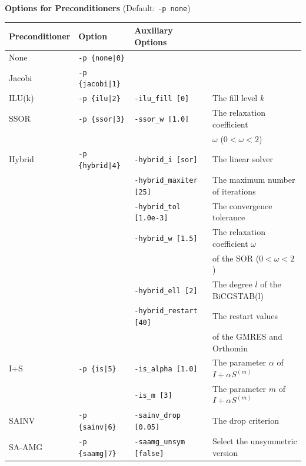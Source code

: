 \documentclass[a4paper]{article}
\begin{document}
\\ \\
\begin{minipage}[t]{\textwidth}
\begin{center}
{\bf Options for Preconditioners} (Default: \verb=-p none=)\\
\begin{tabular}{l|lll}\hline\hline
Preconditioner   & Option           & Auxiliary Options \\ \hline
None     & \verb=-p {none|0}=    &   \\
Jacobi   & \verb=-p {jacobi|1}=  &     \\
ILU(k)   & \verb=-p {ilu|2}=     & \verb=-ilu_fill [0]=        & The fill level $k$ \\
SSOR     & \verb=-p {ssor|3}=    & \verb=-ssor_w [1.0]=        & The relaxation coefficient \\
         &                       &                             & $\omega$ ($0<\omega<2$) \\
Hybrid   & \verb=-p {hybrid|4}=  & \verb=-hybrid_i [sor]=      & The linear solver\\
         &                       & \verb=-hybrid_maxiter [25]= & The maximum number of iterations \\
         &                       & \verb=-hybrid_tol [1.0e-3]= & The convergence tolerance \\
         &                       & \verb=-hybrid_w [1.5]=      & The relaxation coefficient $\omega$ \\
         &                       &                             & of the SOR ($0<\omega<2$) \\
         &                       & \verb=-hybrid_ell [2]=      & The degree $l$ of the BiCGSTAB(l) \\
         &                       & \verb=-hybrid_restart [40]= & The restart values \\
         &                       &                             & of the GMRES and Orthomin \\
I+S      & \verb=-p {is|5}=      & \verb=-is_alpha [1.0]=      & The parameter $\alpha$ of $I+\alpha S^{(m)}$ \\
         &                       & \verb=-is_m [3]=            & The parameter $m$ of $I+\alpha S^{(m)}$ \\
SAINV    & \verb=-p {sainv|6}=   & \verb=-sainv_drop [0.05]=   & The drop criterion\\
SA-AMG   & \verb=-p {saamg|7}=   & \verb=-saamg_unsym [false]= & Select the unsymmetric version    \\

\end{tabular}
\end{center}
\end{minipage}
\end{document}
